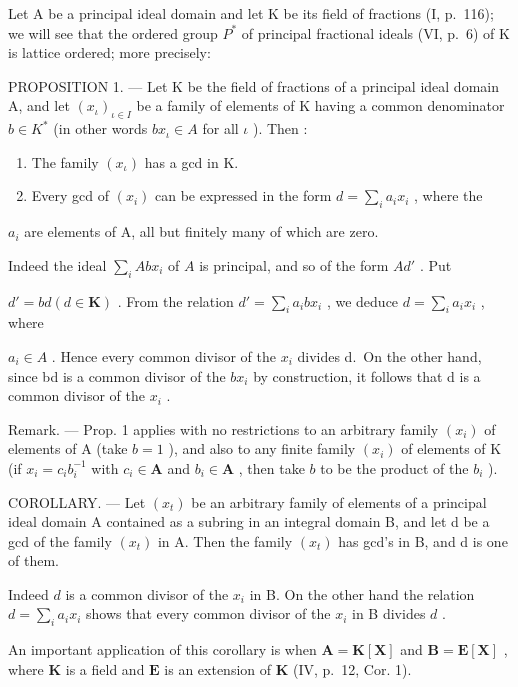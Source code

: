 Let A be a principal ideal domain and let K be its field of fractions (I, p.~116); we will see that the ordered group \(P^{*}\) of principal fractional ideals (VI, p.~6) of K is lattice ordered; more precisely:

PROPOSITION 1. --- Let K be the field of fractions of a principal ideal domain A, and let \((x_{\iota})_{\iota \in I}\) be a family of elements of K having a common denominator \(b \in K^{*}\) (in other words \(bx_{\iota} \in A\) for all \(\iota\) ). Then :

\begin{enumerate}
\def\labelenumi{\alph{enumi})}
\item
  The family \((x_{\iota})\) has a gcd in K.
\item
  Every gcd of \((x_{i})\) can be expressed in the form \(d = \sum_{i}a_{i}x_{i}\) , where the
\end{enumerate}

\(a_{i}\) are elements of A, all but finitely many of which are zero.

Indeed the ideal \(\sum_{i} A b x_{i}\) of \(A\) is principal, and so of the form \(A d'\) . Put

\(d' = bd (d \in \mathbf{K})\) . From the relation \(d' = \sum_{i} a_i b x_i\) , we deduce \(d = \sum_{i} a_i x_i\) , where

\(a_{i} \in A\) . Hence every common divisor of the \(x_{i}\) divides d.~On the other hand, since bd is a common divisor of the \(bx_{i}\) by construction, it follows that d is a common divisor of the \(x_{i}\) .

Remark. --- Prop. 1 applies with no restrictions to an arbitrary family \((x_{i})\) of elements of A (take \(b = 1\) ), and also to any finite family \((x_{i})\) of elements of K (if \(x_{i} = c_{i}b_{i}^{-1}\) with \(c_{i} \in \mathbf{A}\) and \(b_{i} \in \mathbf{A}\) , then take \(b\) to be the product of the \(b_{i}\) ).

COROLLARY. --- Let \((x_{t})\) be an arbitrary family of elements of a principal ideal domain A contained as a subring in an integral domain B, and let d be a gcd of the family \((x_{t})\) in A. Then the family \((x_{t})\) has gcd's in B, and d is one of them.

Indeed \(d\) is a common divisor of the \(x_{i}\) in B. On the other hand the relation \(d = \sum_{i} a_{i} x_{i}\) shows that every common divisor of the \(x_{i}\) in B divides \(d\) .

An important application of this corollary is when \(\mathbf{A} = \mathbf{K}[\mathbf{X}]\) and \(\mathbf{B} = \mathbf{E}[\mathbf{X}]\) , where \(\mathbf{K}\) is a field and \(\mathbf{E}\) is an extension of \(\mathbf{K}\) (IV, p.~12, Cor. 1).

